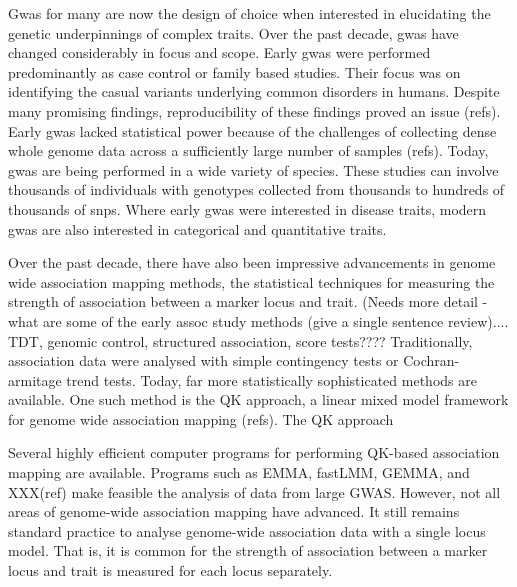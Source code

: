 \documentclass[12pt]{article}
\begin{document}
Gwas for many are now the design of choice when interested in elucidating the genetic 
underpinnings  of complex traits.  Over the past decade, gwas have changed 
considerably in focus and scope. Early gwas 
were performed predominantly as case control or family based studies. Their focus 
was on identifying the casual variants underlying common disorders in humans. 
Despite many promising findings, reproducibility of these findings 
proved an issue (refs). Early gwas  lacked statistical power because of the 
challenges of collecting dense whole genome data across a sufficiently large number of samples (refs).
Today, gwas are being performed in a wide variety of species. These studies can involve thousands
 of individuals with genotypes collected from thousands to hundreds of thousands of snps. 
Where early gwas were interested
 in disease traits, modern gwas are also  interested in  categorical and quantitative traits.


Over the past decade, there have also been impressive advancements in genome wide 
association mapping methods, the statistical techniques for measuring the strength of 
association between a marker locus and trait. (Needs more detail - what are some of the early assoc study methods (give a single sentence review).... TDT, genomic control, structured association, score tests???? 
Traditionally, association data were 
analysed with simple contingency tests or Cochran-armitage  trend tests. Today, far 
more statistically sophisticated methods are available. One such method is the  QK 
approach, a linear mixed model framework for genome wide association 
mapping (refs).  The QK approach 


Several highly efficient computer programs for performing QK-based 
association mapping are available. Programs such as EMMA, fastLMM, GEMMA, and 
XXX(ref) make feasible the analysis of data from large GWAS. 
 However, not all areas of genome-wide association 
mapping have advanced. It still remains standard practice to analyse genome-wide 
association data with a single locus model. That is,  it is common for the strength of 
association between a marker locus and trait is measured for each locus separately. 
\end{document}
